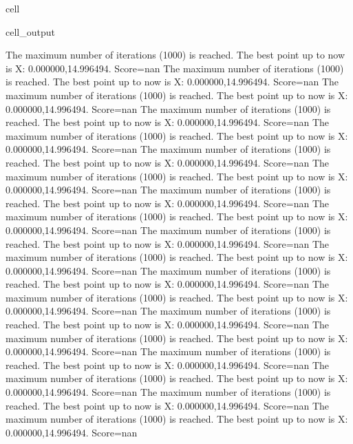 \documentclass[letterpaper,10pt,english]{jupyterBook}
\begin{document}
\begin{sphinxuseclass}{cell}
\begin{sphinxVerbatimOutput}
\begin{sphinxuseclass}{cell_output}
\begin{sphinxVerbatim}[commandchars=\\\{\}]
The maximum number of iterations (1000) is reached. The best point up to now is X: \PYGZob{}0.000000,14.996494\PYGZcb{}. Score=\PYGZhy{}nan
The maximum number of iterations (1000) is reached. The best point up to now is X: \PYGZob{}0.000000,14.996494\PYGZcb{}. Score=\PYGZhy{}nan
The maximum number of iterations (1000) is reached. The best point up to now is X: \PYGZob{}0.000000,14.996494\PYGZcb{}. Score=\PYGZhy{}nan
The maximum number of iterations (1000) is reached. The best point up to now is X: \PYGZob{}0.000000,14.996494\PYGZcb{}. Score=\PYGZhy{}nan
The maximum number of iterations (1000) is reached. The best point up to now is X: \PYGZob{}0.000000,14.996494\PYGZcb{}. Score=\PYGZhy{}nan
The maximum number of iterations (1000) is reached. The best point up to now is X: \PYGZob{}0.000000,14.996494\PYGZcb{}. Score=\PYGZhy{}nan
The maximum number of iterations (1000) is reached. The best point up to now is X: \PYGZob{}0.000000,14.996494\PYGZcb{}. Score=\PYGZhy{}nan
The maximum number of iterations (1000) is reached. The best point up to now is X: \PYGZob{}0.000000,14.996494\PYGZcb{}. Score=\PYGZhy{}nan
The maximum number of iterations (1000) is reached. The best point up to now is X: \PYGZob{}0.000000,14.996494\PYGZcb{}. Score=\PYGZhy{}nan
The maximum number of iterations (1000) is reached. The best point up to now is X: \PYGZob{}0.000000,14.996494\PYGZcb{}. Score=\PYGZhy{}nan
The maximum number of iterations (1000) is reached. The best point up to now is X: \PYGZob{}0.000000,14.996494\PYGZcb{}. Score=\PYGZhy{}nan
The maximum number of iterations (1000) is reached. The best point up to now is X: \PYGZob{}0.000000,14.996494\PYGZcb{}. Score=\PYGZhy{}nan
The maximum number of iterations (1000) is reached. The best point up to now is X: \PYGZob{}0.000000,14.996494\PYGZcb{}. Score=\PYGZhy{}nan
The maximum number of iterations (1000) is reached. The best point up to now is X: \PYGZob{}0.000000,14.996494\PYGZcb{}. Score=\PYGZhy{}nan
The maximum number of iterations (1000) is reached. The best point up to now is X: \PYGZob{}0.000000,14.996494\PYGZcb{}. Score=\PYGZhy{}nan
The maximum number of iterations (1000) is reached. The best point up to now is X: \PYGZob{}0.000000,14.996494\PYGZcb{}. Score=\PYGZhy{}nan
The maximum number of iterations (1000) is reached. The best point up to now is X: \PYGZob{}0.000000,14.996494\PYGZcb{}. Score=\PYGZhy{}nan
The maximum number of iterations (1000) is reached. The best point up to now is X: \PYGZob{}0.000000,14.996494\PYGZcb{}. Score=\PYGZhy{}nan
The maximum number of iterations (1000) is reached. The best point up to now is X: \PYGZob{}0.000000,14.996494\PYGZcb{}. Score=\PYGZhy{}nan

\end{sphinxVerbatim}
\end{sphinxuseclass}
\end{sphinxVerbatimOutput}
\end{sphinxuseclass}
\end{document}
